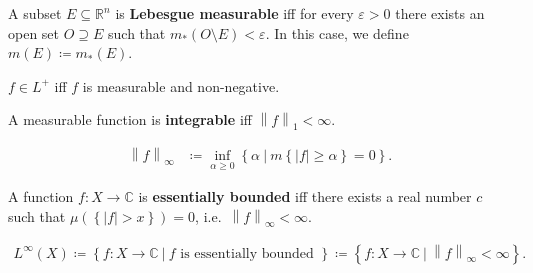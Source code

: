 \begin{definition}

A subset \(E\subseteq {\mathbb{R}}^n\) is \textbf{Lebesgue measurable}
iff for every \(\varepsilon> 0\) there exists an open set
\(O \supseteq E\) such that \(m_*(O\setminus E) < \varepsilon\). In this
case, we define \(m(E) \coloneqq m_*(E)\).

\end{definition}

\begin{definition}

\(f\in L^+\) iff \(f\) is measurable and non-negative.

\end{definition}

\begin{definition}[Integrability]

A measurable function is \textbf{integrable} iff
\({\left\lVert {f} \right\rVert}_1 < \infty\).

\end{definition}

\begin{definition}

\begin{align*}
{\left\lVert {f} \right\rVert}_\infty &\coloneqq\inf_{\alpha \geq 0} \left\{{\alpha {~\mathrel{\Big|}~}m\left\{{{\left\lvert {f} \right\rvert} \geq \alpha}\right\} = 0}\right\}
.\end{align*}

\end{definition}

\begin{definition}

A function \(f:X \to {\mathbb{C}}\) is \textbf{essentially bounded} iff
there exists a real number \(c\) such that
\(\mu(\left\{{{\left\lvert {f} \right\rvert} > x}\right\}) = 0\),
i.e.~\({\left\lVert {f} \right\rVert}_\infty < \infty\).

\end{definition}

\begin{definition}[$L^\infty$]

\begin{align*}
L^\infty(X)
\coloneqq\left\{{f: X\to {\mathbb{C}}{~\mathrel{\Big|}~}f \text{ is essentially bounded }}\right\}
\coloneqq\left\{{f: X\to {\mathbb{C}}{~\mathrel{\Big|}~}{\left\lVert {f} \right\rVert}_{\infty }< \infty}\right\}
.\end{align*}

\end{definition}

